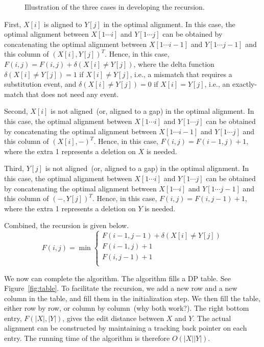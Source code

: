 \begin{figure}[h]
\centering{}
\caption{Illustration of the three cases in developing the recursion.}
\label{fig:recursion}
\end{figure}


First, $X[i]$ is aligned to $Y[j]$ in the optimal alignment. In this case, the optimal alignment
between $X[1\cdots i]$ and $Y[1\cdots j]$ can be obtained by concatenating the optimal alignment
between $X[1\cdots i-1]$ and $Y[1\cdots j-1]$ and this column of $(X[i], Y[j])^T$.
Hence, in this case, $F(i,j) = F(i, j) + \delta(X[i] \neq Y[j])$, where the delta function
$\delta(X[i] \neq Y[j]) = 1$ if $X[i] \neq Y[j]$, i.e., a mismatch that requires a substitution event,
and $\delta(X[i] \neq Y[j]) = 0$ if $X[i] = Y[j]$, i.e., an exactly-match that does not need any event.

Second, $X[i]$ is not aligned~(or, aligned to a gap) in the optimal alignment. In this case, the optimal alignment
between $X[1\cdots i]$ and $Y[1\cdots j]$ can be obtained by concatenating the optimal alignment
between $X[1\cdots i-1]$ and $Y[1\cdots j]$ and this column of $(X[i], -)^T$.
Hence, in this case, $F(i,j) = F(i-1, j) + 1$, where 
the extra 1 represents a deletion on $X$ is needed.

Third, $Y[j]$ is not aligned~(or, aligned to a gap) in the optimal alignment. In this case, the optimal alignment
between $X[1\cdots i]$ and $Y[1\cdots j]$ can be obtained by concatenating the optimal alignment
between $X[1\cdots i]$ and $Y[1\cdots j-1]$ and this column of $(-, Y[j])^T$.
Hence, in this case, $F(i,j) = F(i, j- 1) + 1$, where 
the extra 1 represents a deletion on $Y$ is needed.

Combined, the recursion is given below.
\begin{displaymath}
F(i,j) = \min\left\{
	\begin{array}{llll}
	F(i-1,j-1) + \delta(X[i] \neq Y[j]) \\
	F(i-1,j) + 1 \\
	F(i,j-1) + 1 \\
	\end{array}
\right.
\end{displaymath}

We now can complete the algorithm. The algorithm fills a DP table. See Figure~\ref{fig:table}.
To facilitate the recursion, we add a new row and a new column in the table,
and fill them in the initialization step. 
We then fill the table, either row by row, or column by column~(why both work?).
The right bottom entry, $F(|X|, |Y|)$, gives the edit distance between $X$ and $Y$.
The actual alignment can be constructed by maintaining a tracking back pointer on each entry.
The running time of the algorithm is therefore $O(|X||Y|)$.

